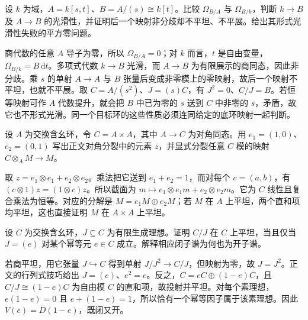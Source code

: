 \begin{optionalexercise}\label{b3:ex:23-closed-point-unramified}
	设 \(k\) 为域，\(A=k[s,t]\)、\(B=A/(s)\cong k[t]\)。比较 \(\Omega_{B/A}\) 与 \(\Omega_{B/k}\)，判断 \(k\to B\) 及 \(A\to B\) 的光滑性，并证明后一个映射非分歧却不平坦、不平展。给出其形式光滑性失败的平方零问题。
\end{optionalexercise}
\begin{solution}
	商代数的任意 \(A\) 导子为零，所以 \(\Omega_{B/A}=0\)；对 \(k\) 而言，\(t\) 是自由变量，\(\Omega_{B/k}=B\,\mathrm{d}t\)。多项式代数 \(k\to B\) 光滑，而 \(A\to B\) 为有限展示的商同态，因此非分歧。乘 \(s\) 的单射 \(A\to A\) 与 \(B\) 张量后变成非零模上的零映射，故后一个映射不平坦，也就不平展。取 \(C=A/(s^2)\)、\(J=(s)C\)，有 \(J^2=0\)、\(C/J=B\)。若恒等映射可作 \(A\) 代数提升，就会把 \(B\) 中已为零的 \(s\) 送到 \(C\) 中非零的 \(s\)，矛盾，故它也不形式光滑。同一个目标环的这些性质必须连同给定的底环映射一起判断。
\end{solution}

\begin{optionalexercise}\label{b3:ex:23-product-diagonal}
	设 \(A\) 为交换含幺环，令 \(C=A\times A\)，其中 \(A\to C\) 为对角同态。用 \(e_1=(1,0)\)、\(e_2=(0,1)\) 写出正文对角分裂中的元素 \(z\)，并显式分裂任意 \(C\) 模的映射 \(C\otimes_AM\to M\)。
\end{optionalexercise}
\begin{solution}
	取 \(z=e_1\otimes e_1+e_2\otimes e_2\)。乘法把它送到 \(e_1+e_2=1\)，而对每个 \(c=(a,b)\)，有 \((c\otimes1)z=(1\otimes c)z\)。所以截面为 \(m\mapsto e_1\otimes e_1m+e_2\otimes e_2m\)。它为 \(C\) 线性且复合乘法为恒等。对应的分解是 \(M=e_1M\oplus e_2M\)；若 \(M\) 在 \(A\) 上平坦，两个直和项均平坦，这也直接证明 \(M\) 在 \(A\times A\) 上平坦。
\end{solution}

\begin{optionalexercise}\label{b3:ex:23-finite-flat-quotient}
	设 \(C\) 为交换含幺环，\(J\subseteq C\) 为有限生成理想。证明 \(C/J\) 在 \(C\) 上平坦，当且仅当 \(J=(e)\) 对某个幂等元 \(e\in C\) 成立。解释相应闭子谱为何也为开子谱。
\end{optionalexercise}
\begin{solution}
	若商平坦，用它张量 \(J\hookrightarrow C\) 得到单射 \(J/J^2\to C/J\)，但映射为零，故 \(J=J^2\)。正文的行列式技巧给出 \(J=(e)\)、\(e^2=e\)。反之，\(C=eC\oplus(1-e)C\)，且 \(C/J\cong(1-e)C\) 为自由模 \(C\) 的直和项，故投射并平坦。对每个素理想，\(e(1-e)=0\) 且 \(e+(1-e)=1\)，所以恰有一个幂等因子属于该素理想。因此 \(V(e)=D(1-e)\)，既闭又开。
\end{solution}

